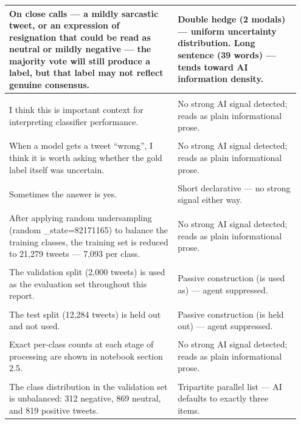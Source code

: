 \documentclass[11pt]{article}
\begin{document}
\begin{longtable}{|p{0.55\linewidth}|p{0.40\linewidth}|}
\hline
On close calls --- a mildly sarcastic tweet, or an expression of resignation that could be read as neutral or mildly negative --- the majority vote will still produce a label, but that label may not reflect genuine consensus. & Double hedge (2 modals) --- uniform uncertainty distribution. Long sentence (39 words) --- tends toward AI information density. \\[2pt]
\hline
\rule{0pt}{3.5cm} & \\
\hline
I think this is important context for interpreting classifier performance. & No strong AI signal detected; reads as plain informational prose. \\[2pt]
\hline
\rule{0pt}{3.5cm} & \\
\hline
When a model gets a tweet ``wrong'', I think it is worth asking whether the gold label itself was uncertain. & No strong AI signal detected; reads as plain informational prose. \\[2pt]
\hline
\rule{0pt}{3.5cm} & \\
\hline
Sometimes the answer is yes. & Short declarative --- no strong signal either way. \\[2pt]
\hline
\rule{0pt}{3.5cm} & \\
\hline
After applying random undersampling (random \_state=82171165) to balance the training classes, the training set is reduced to 21,279 tweets --- 7,093 per class. & No strong AI signal detected; reads as plain informational prose. \\[2pt]
\hline
\rule{0pt}{3.5cm} & \\
\hline
The validation split (2,000 tweets) is used as the evaluation set throughout this report. & Passive construction (is used as) --- agent suppressed. \\[2pt]
\hline
\rule{0pt}{3.5cm} & \\
\hline
The test split (12,284 tweets) is held out and not used. & Passive construction (is held out) --- agent suppressed. \\[2pt]
\hline
\rule{0pt}{3.5cm} & \\
\hline
Exact per-class counts at each stage of processing are shown in notebook section 2.5. & No strong AI signal detected; reads as plain informational prose. \\[2pt]
\hline
\rule{0pt}{3.5cm} & \\
\hline
The class distribution in the validation set is unbalanced: 312 negative, 869 neutral, and 819 positive tweets. & Tripartite parallel list --- AI defaults to exactly three items. \\[2pt]

\end{longtable}
\end{document}
